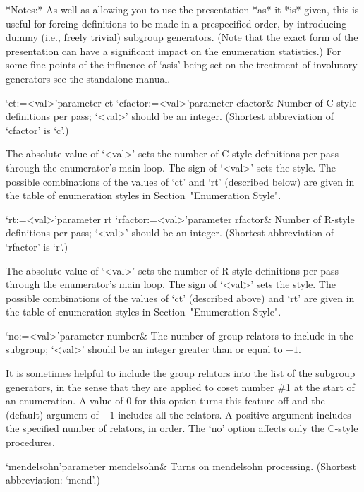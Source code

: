 *Notes:* As well as allowing you  to use the presentation *as* it *is*
given,  this  is  useful for  forcing  definitions  to  be made  in  a
prespecified  order,  by  introducing  dummy  (i.e.,  freely  trivial)
subgroup generators.   (Note that the  exact form of  the presentation
can  have a significant  impact on  the enumeration  statistics.)  For
some fine points of the influence of `asis' being set on the treatment
of involutory generators see the {\ACE} standalone manual.



\beginitems

\>`ct:=<val>'{parameter ct}
\>`cfactor:=<val>'{parameter cfactor}&
Number of C-style definitions per pass; `<val>' should be an  integer. 
(Shortest abbreviation of `cfactor' is `c'.)

The absolute value of `<val>' sets the
number of C-style definitions per  pass through  the enumerator's main
loop. The sign of `<val>'  sets the  style. The possible  combinations
of the values of `ct' and  `rt'  (described below)  are  given in  the
table of  enumeration styles in Section~"Enumeration Style".

\>`rt:=<val>'{parameter rt}
\>`rfactor:=<val>'{parameter rfactor}&
Number of R-style definitions per pass; `<val>' should be an  integer. 
(Shortest abbreviation of `rfactor' is `r'.)

The absolute value of `<val>' sets the
number of R-style definitions per  pass through  the enumerator's main
loop. The sign of `<val>'  sets the  style. The possible  combinations
of the values of `ct' (described above)  and  `rt'  are  given in  the
table of  enumeration styles in Section~"Enumeration Style".

\>`no:=<val>'{parameter  number}&
The number of group relators to include in the subgroup; `<val>' should
be an integer greater than or equal to $-1$.

It is sometimes helpful to include the group relators into the list of
the subgroup generators,  in the sense that they  are applied to coset
number  \#1 at the  start of  an enumeration.  A value  of 0  for this
option  turns this  feature off  and  the (default)  argument of  $-1$
includes all the relators.  A positive argument includes the specified
number of relators, in order. The `no' option affects only the C-style
procedures.

\>`mendelsohn'{parameter mendelsohn}&
Turns on mendelsohn processing. (Shortest abbreviation: `mend'.)

